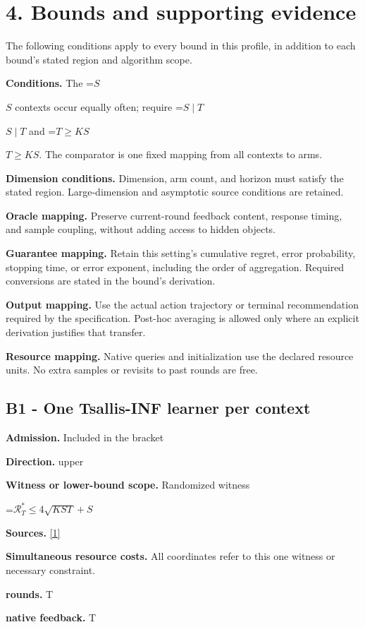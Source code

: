 \documentclass[10pt,a4paper]{article}
\newcommand{\AtlasMath}[1]{\par\begingroup\centering\setbox0=\hbox{$\displaystyle #1$}\ifdim\wd0>1.4\linewidth\typeout{ATLAS WIDE FORMULA: \the\wd0}\fi\ifdim\wd0>\linewidth\resizebox{\linewidth}{!}{\box0}\else\box0\fi\par\endgroup}
\newcommand{\AtlasInlineMath}[1]{\begingroup\setbox0=\hbox{$#1$}\ifdim\wd0>.4\linewidth\endgroup\AtlasMath{#1}\else\endgroup$#1$\fi}
\begin{document}
\section{4. Bounds and supporting evidence}
The following conditions apply to every bound in this profile, in addition to each bound's stated region and algorithm scope.

\textbf{Conditions.} The \AtlasInlineMath{S} contexts occur equally often; require \AtlasInlineMath{S\mid T} and \AtlasInlineMath{T\ge KS}. The comparator is one fixed mapping from all contexts to arms.

\textbf{Dimension conditions.} Dimension, arm count, and horizon must satisfy the stated region. Large-dimension and asymptotic source conditions are retained.

\textbf{Oracle mapping.} Preserve current-round feedback content, response timing, and sample coupling, without adding access to hidden objects.

\textbf{Guarantee mapping.} Retain this setting's cumulative regret, error probability, stopping time, or error exponent, including the order of aggregation. Required conversions are stated in the bound's derivation.

\textbf{Output mapping.} Use the actual action trajectory or terminal recommendation required by the specification. Post-hoc averaging is allowed only where an explicit derivation justifies that transfer.

\textbf{Resource mapping.} Native queries and initialization use the declared resource units. No extra samples or revisits to past rounds are free.

\subsection{B1 - One Tsallis-INF learner per context}
\textbf{Admission.} Included in the bracket

\textbf{Direction.} upper

\textbf{Witness or lower-bound scope.} Randomized witness

\AtlasMath{\mathcal{R}_T^*\le4\sqrt{KST}+S}
\textbf{Sources.} \href{https://jmlr.org/papers/volume22/19-753/19-753.pdf}{[1]}

\textbf{Simultaneous resource costs.} All coordinates refer to this one witness or necessary constraint.

\textbf{rounds.} T

\textbf{native feedback.} T
\end{document}

